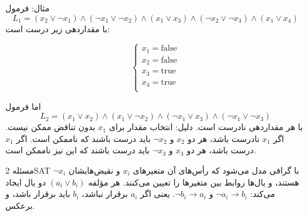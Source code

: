 مثال: فرمول
\[
L_1 = (x_2 \lor \lnot x_1) \land
      (\lnot x_1 \lor \lnot x_2) \land
      (x_1 \lor x_3) \land
      (\lnot x_2 \lor \lnot x_3) \land
      (x_1 \lor x_4)
\]
با مقداردهی زیر درست است:

\[
\begin{cases}
x_1 = \textrm{false} \\
x_2 = \textrm{false} \\
x_3 = \textrm{true} \\
x_4 = \textrm{true} \\
\end{cases}
\]

اما فرمول
\[
L_2 = (x_1 \lor x_2) \land
      (x_1 \lor \lnot x_2) \land
      (\lnot x_1 \lor x_3) \land
      (\lnot x_1 \lor \lnot x_3)
\]
با هر مقداردهی نادرست است.
دلیل: انتخاب مقدار برای $x_1$ بدون تناقض ممکن نیست.
اگر $x_1$ نادرست باشد، هر دو $x_2$ و $\lnot x_2$ باید درست باشند که ناممکن است.
اگر $x_1$ درست باشد، هر دو $x_3$ و $\lnot x_3$ باید درست باشند که این نیز ناممکن است.

مسئله 2SAT با گرافی مدل می‌شود که رأس‌های آن متغیرهای $x_i$ و نقیض‌هایشان $\lnot x_i$ هستند، و یال‌ها روابط بین متغیرها را تعیین می‌کنند.
هر مؤلفه $(a_i \lor b_i)$ دو یال ایجاد می‌کند:
$\lnot a_i \to b_i$ و $\lnot b_i \to a_i$.
یعنی اگر $a_i$ برقرار نباشد، $b_i$ باید برقرار باشد، و برعکس.

